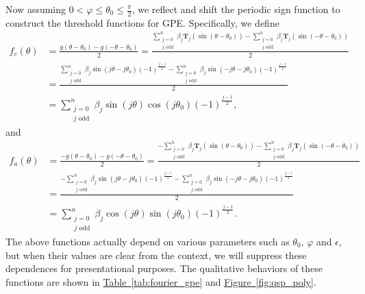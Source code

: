 \documentclass[letterpaper,onecolumn,11pt,accepted=2026-02-14]{quantumarticle}
\theoremstyle{remark}
\theoremstyle{plain}
\newcommand{\fig}[1]{\hyperref[fig:#1]{Figure~\ref*{fig:#1}}}
\newcommand{\tab}[1]{\hyperref[tab:#1]{Table~\ref*{tab:#1}}}
\begin{document}
Now assuming $0<\varphi\leq\theta_0\leq\frac{\pi}{2}$, we reflect and shift the periodic sign function  to construct the threshold functions for GPE. Specifically, we define
\begin{equation}
\begin{aligned}
    f_c(\theta)&=\frac{g(\theta-\theta_0)-g(-\theta-\theta_0)}{2}
    =\frac{\sum\limits_{\substack{j=0\\j\text{ odd}}}^{n}\beta_j\mathbf{T}_j(\sin(\theta-\theta_0))
    -\sum\limits_{\substack{j=0\\j\text{ odd}}}^{n}\beta_j\mathbf{T}_j(\sin(-\theta-\theta_0))}{2}\\
    &=\frac{\sum\limits_{\substack{j=0\\j\text{ odd}}}^{n}\beta_j\sin(j\theta-j\theta_0)(-1)^{\frac{j-1}{2}}
    -\sum\limits_{\substack{j=0\\j\text{ odd}}}^{n}\beta_j\sin(-j\theta-j\theta_0)(-1)^{\frac{j-1}{2}}}{2}\\
    &=\sum\limits_{\substack{j=0\\j\text{ odd}}}^{n}\beta_j\sin(j\theta)\cos(j\theta_0)(-1)^{\frac{j-1}{2}},
\end{aligned}
\end{equation}
and
\begin{equation}
\begin{aligned}
    f_a(\theta)&=\frac{-g(\theta-\theta_0)-g(-\theta-\theta_0)}{2}
    =\frac{-\sum\limits_{\substack{j=0\\j\text{ odd}}}^{n}\beta_j\mathbf{T}_j(\sin(\theta-\theta_0))
    -\sum\limits_{\substack{j=0\\j\text{ odd}}}^{n}\beta_j\mathbf{T}_j(\sin(-\theta-\theta_0))}{2}\\
    &=\frac{-\sum\limits_{\substack{j=0\\j\text{ odd}}}^{n}\beta_j\sin(j\theta-j\theta_0)(-1)^{\frac{j-1}{2}}
    -\sum\limits_{\substack{j=0\\j\text{ odd}}}^{n}\beta_j\sin(-j\theta-j\theta_0)(-1)^{\frac{j-1}{2}}}{2}\\
    &=\sum\limits_{\substack{j=0\\j\text{ odd}}}^{n}\beta_j\cos(j\theta)\sin(j\theta_0)(-1)^{\frac{j-1}{2}}.
\end{aligned}
\end{equation}
The above functions actually depend on various parameters such as $\theta_0$, $\varphi$ and $\epsilon$, but when their values are clear from the context, we will suppress these dependences for presentational purposes.
The qualitative behaviors of these functions are shown in \tab{fourier_gpe} and \fig{qsp_poly}.
\end{document}
